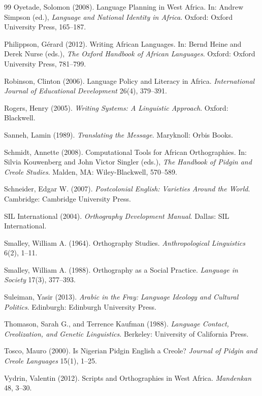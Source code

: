 \documentclass[12pt]{article}
\begin{document}
\begin{thebibliography}{99}
Oyetade, Solomon (2008).
Language Planning in West Africa.
In: Andrew Simpson (ed.),
\textit{Language and National Identity in Africa}.
Oxford: Oxford University Press, 165--187.

Philippson, Gérard (2012).
Writing African Languages.
In: Bernd Heine and Derek Nurse (eds.),
\textit{The Oxford Handbook of African Languages}.
Oxford: Oxford University Press, 781--799.

Robinson, Clinton (2006).
Language Policy and Literacy in Africa.
\textit{International Journal of Educational Development} 26(4), 379--391.

Rogers, Henry (2005).
\textit{Writing Systems: A Linguistic Approach}.
Oxford: Blackwell.

Sanneh, Lamin (1989).
\textit{Translating the Message}.
Maryknoll: Orbis Books.

Schmidt, Annette (2008).
Computational Tools for African Orthographies.
In: Silvia Kouwenberg and John Victor Singler (eds.),
\textit{The Handbook of Pidgin and Creole Studies}.
Malden, MA: Wiley-Blackwell, 570--589.

Schneider, Edgar W. (2007).
\textit{Postcolonial English: Varieties Around the World}.
Cambridge: Cambridge University Press.

SIL International (2004).
\textit{Orthography Development Manual}.
Dallas: SIL International.

Smalley, William A. (1964).
Orthography Studies.
\textit{Anthropological Linguistics} 6(2), 1--11.

Smalley, William A. (1988).
Orthography as a Social Practice.
\textit{Language in Society} 17(3), 377--393.

Suleiman, Yasir (2013).
\textit{Arabic in the Fray: Language Ideology and Cultural Politics}.
Edinburgh: Edinburgh University Press.

Thomason, Sarah G., and Terrence Kaufman (1988).
\textit{Language Contact, Creolization, and Genetic Linguistics}.
Berkeley: University of California Press.

Tosco, Mauro (2000).
Is Nigerian Pidgin English a Creole?
\textit{Journal of Pidgin and Creole Languages} 15(1), 1--25.

Vydrin, Valentin (2012).
Scripts and Orthographies in West Africa.
\textit{Mandenkan} 48, 3--30.


\end{thebibliography}
\end{document}
